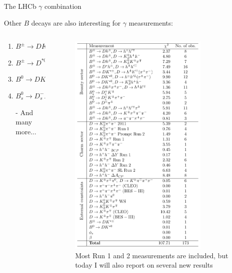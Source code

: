 \documentclass[dvipsnames]{beamer}
\begin{document}
\begin{frame}{The LHCb $\gamma$ combination}
  \begin{center}
    \Large Other $B$ decays are also interesting for $\gamma$ measurements:
  \end{center}
  \vspace{0.2cm}
  \begin{columns}
    \begin{column}{0.4\textwidth}
      \vspace{1.5cm}
      \begin{enumerate}
        \item{$B^\pm\to DK^\pm$}
        \item{$B^\pm\to D^{*0}K^\pm$}
        \item{$B^0\to DK^{*0}$}
        \item{$B_s^0\to D_s^-K^+$}
        \item[-]{And many more...}
      \end{enumerate}
      \vspace{1.5cm}
    \end{column}
    \begin{column}{0.6\textwidth}
      \begin{figure}
        \centering
        \caption*{Most Run 1 and 2 measurements are included, but today I will also report on several new results}
        \includegraphics[width=0.8\textwidth,trim={0 10.34cm 0 0},clip=true]{Plots/Modes_chi2_gammacharm.pdf}

\end{figure}
\end{column}
\end{columns}
\end{frame}
\end{document}
